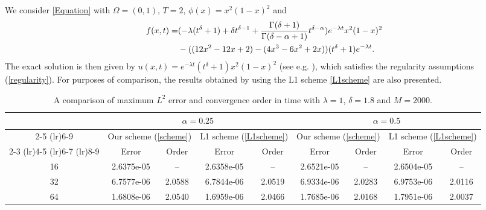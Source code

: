 \documentclass[10pt, reqno]{amsart}
\theoremstyle{remark}
\theoremstyle{definition}
\numberwithin{table}{section}
\begin{document}
We consider \eqref{Equation} with $\Omega=(0,1)$, $T=2$, $\phi(x)=x^2(1-x)^2$ and 
\begin{align}
f(x,t) = & ( -\lambda (t^\delta + 1) + \delta t^{\delta - 1} + \frac{\Gamma(\delta+1)}{\Gamma(\delta-\alpha+1)} t^{\delta-\alpha} ) e^{-\lambda t} x^2(1-x)^2 \notag\\
& - ( (12x^2 - 12x + 2) - (4x^3 - 6x^2 + 2x) ) (t^\delta + 1) e^{-\lambda t}.\notag
\end{align}
The exact solution is then given by $u(x,t) = e^{-\lambda t} (t^\delta + 1) x^2(1-x)^2$ (see e.g. \cite{Alikhanov2024_1,cao2020,chen2018,dwivedi2024,stynes2017}), which satisfies the regularity assumptions (\ref{regularity}).  For purposes of comparison, the results obtained by using the L1 scheme \eqref{L1scheme} are also presented.
\begin{table}[htbp]
\centering
\setlength{\tabcolsep}{5pt}   %
\caption{A comparison of maximum $L^2$ error and convergence order in time with $\lambda=1$, $\delta=1.8$ and $M=2000$.}
\label{table:errors1t}
\begin{tabular}{c c c c c c c c c}
\toprule
& \multicolumn{4}{c}{$\alpha=0.25$} 
& \multicolumn{4}{c}{$\alpha=0.5$} \\
\cmidrule(lr){2-5} \cmidrule(lr){6-9}
 & \multicolumn{2}{c}{Our scheme (\ref{scheme})} & \multicolumn{2}{c}{L1 scheme (\ref{L1scheme})}   & \multicolumn{2}{c}{Our scheme (\ref{scheme})} & \multicolumn{2}{c}{L1 scheme (\ref{L1scheme})} \\
\cmidrule(lr){2-3} \cmidrule(lr){4-5} \cmidrule(lr){6-7} \cmidrule(lr){8-9}
\multirow{1}{*}{$N$} & Error & Order & Error & Order & Error & Order & Error & Order \\
\midrule
16
& 2.6375e-05  &  --  & 2.6358e-05 &  --  & 2.6521e-05 & --   & 2.6504e-05  & -- \\
32
& 6.7577e-06 &  2.0588 & 6.7844e-06 & 2.0519 & 6.9334e-06 & 2.0283   &  6.9753e-06 & 2.0116 \\
64
& 1.6808e-06  & 2.0540 & 1.6959e-06  & 2.0466   & 1.7685e-06 & 2.0168   & 1.7951e-06 & 2.0037 \\
\bottomrule
\end{tabular}
\end{table}
\end{document}
